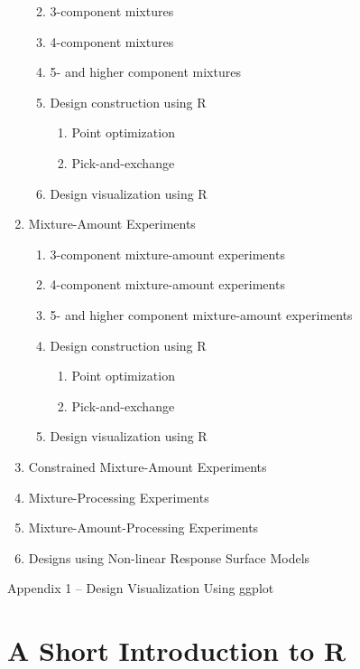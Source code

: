 \documentclass[
  letterpaper,
  DIV=11,
  numbers=noendperiod]{scrreprt}
\begin{document}
\begin{enumerate}
  \begin{enumerate}
  \def\labelenumii{\arabic{enumii}.}
  \item
    3-component mixtures
  \item
    4-component mixtures
  \item
    5- and higher component mixtures~
  \item
    Design construction using R~

    \begin{enumerate}
    \def\labelenumiii{\arabic{enumiii}.}
    \item
      Point optimization
    \item
      Pick-and-exchange
    \end{enumerate}
  \item
    Design visualization using R~
  \end{enumerate}
\item
  Mixture-Amount Experiments

  \begin{enumerate}
  \def\labelenumii{\arabic{enumii}.}
  \item
    3-component mixture-amount experiments
  \item
    4-component mixture-amount experiments
  \item
    5- and higher component mixture-amount experiments~
  \item
    Design construction using R~

    \begin{enumerate}
    \def\labelenumiii{\arabic{enumiii}.}
    \item
      Point optimization
    \item
      Pick-and-exchange
    \end{enumerate}
  \item
    Design visualization using R
  \end{enumerate}
\item
  Constrained Mixture-Amount Experiments
\item
  Mixture-Processing Experiments
\item
  Mixture-Amount-Processing Experiments
\item
  Designs using Non-linear Response Surface Models
\end{enumerate}

Appendix 1 -- Design Visualization Using ggplot


\chapter{A Short Introduction to R}\label{a-short-introduction-to-r}
\end{document}
